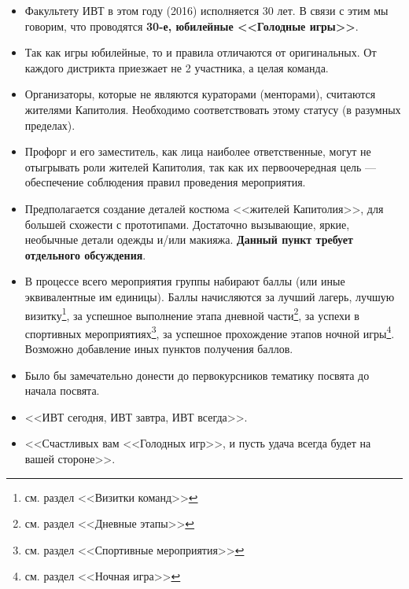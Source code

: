 
\begin{itemize}
\item Факультету ИВТ в этом году (2016) исполняется 30 лет. В связи с этим мы говорим, что проводятся \textbf{30-е, юбилейные <<Голодные игры>>}.

\item Так как игры юбилейные, то и правила отличаются от оригинальных. От каждого дистрикта приезжает не 2 участника, а целая команда.

\item Организаторы, которые не являются кураторами (менторами), считаются жителями Капитолия. Необходимо соответствовать этому статусу (в разумных пределах).

\item Профорг и его заместитель, как лица наиболее ответственные, могут не отыгрывать роли жителей Капитолия, так как их первоочередная цель --- обеспечение соблюдения правил проведения мероприятия.

\item Предполагается создание деталей костюма <<жителей Капитолия>>, для большей схожести с прототипами. Достаточно вызывающие, яркие, необычные детали одежды и/или макияжа. \textbf{Данный пункт требует отдельного обсуждения}.

\item В процессе всего мероприятия группы набирают баллы (или иные эквивалентные им единицы). Баллы начисляются за лучший лагерь, лучшую визитку\footnote{см. раздел <<Визитки команд>>}, за успешное выполнение этапа дневной части\footnote{см. раздел <<Дневные этапы>>}, за успехи в спортивных мероприятиях\footnote{см. раздел <<Спортивные мероприятия>>}, за успешное прохождение этапов ночной игры\footnote{см. раздел <<Ночная игра>>}. Возможно добавление иных пунктов получения баллов.

\item Было бы замечательно донести до первокурсников тематику посвята до начала посвята.

\item <<ИВТ сегодня, ИВТ завтра, ИВТ всегда>>.

\item <<Счастливых вам <<Голодных игр>>, и пусть удача всегда будет на вашей стороне>>.
\end{itemize}